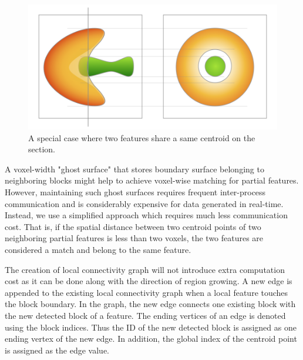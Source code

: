 \documentclass[10pt, conference, compsocconf]{IEEEtran}
\begin{document}
\begin{figure}[ht]
\centering
\includegraphics[width=0.9\linewidth]{figure1@2x.png}
\caption{A special case where two features share a same centroid on the section.}
\label{fig:special}
\end{figure}

A voxel-width "ghost surface" that stores boundary surface belonging to neighboring blocks might help to achieve voxel-wise matching for partial features. However, maintaining such ghost surfaces requires frequent inter-process communication and is considerably expensive for data generated in real-time. Instead, we use a simplified approach which requires much less communication cost. That is, if the spatial distance between two centroid points of two neighboring partial features is less than two voxels, the two features are considered a match and belong to the same feature.

The creation of local connectivity graph will not introduce extra computation cost as it can be done along with the direction of region growing. A new edge is appended to the existing local connectivity graph when a local feature touches the block boundary. In the graph, the new edge connects one existing block with the new detected block of a feature. The ending vertices of an edge is denoted using the block indices. Thus the ID of the new detected block is assigned as one ending vertex of the new edge. In addition, the global index of the centroid point is assigned as the edge value. 
\end{document}
